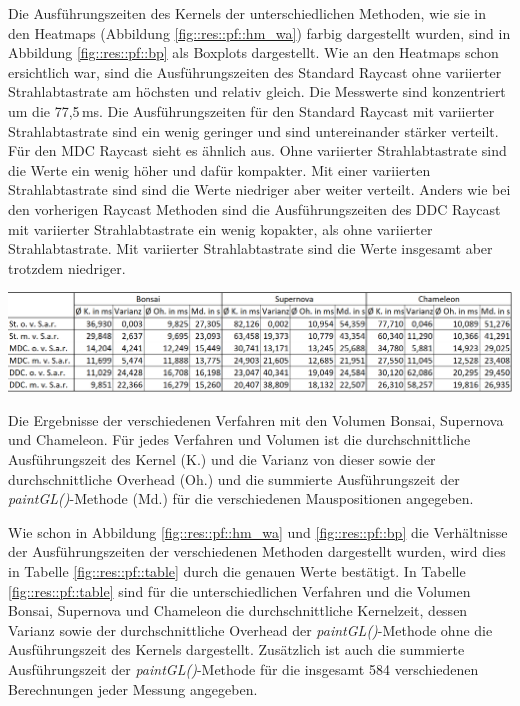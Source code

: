 Die Ausführungszeiten des Kernels der unterschiedlichen Methoden, wie sie in den Heatmaps (Abbildung \ref{fig::res::pf::hm_wa}) farbig dargestellt wurden, sind in Abbildung \ref{fig::res::pf::bp} als Boxplots dargestellt.
Wie an den Heatmaps schon ersichtlich war, sind die Ausführungszeiten des Standard Raycast ohne variierter Strahlabtastrate am höchsten und relativ gleich.
Die Messwerte sind konzentriert um die 77,5\,ms.
Die Ausführungszeiten für den Standard Raycast mit variierter Strahlabtastrate sind ein wenig geringer und sind untereinander stärker verteilt.
Für den MDC Raycast sieht es ähnlich aus.
Ohne variierter Strahlabtastrate sind die Werte ein wenig höher und dafür kompakter.
Mit einer variierten Strahlabtastrate sind sind die Werte niedriger aber weiter verteilt.
Anders wie bei den vorherigen Raycast Methoden sind die Ausführungszeiten des DDC Raycast mit variierter Strahlabtastrate ein wenig kopakter, als ohne variierter Strahlabtastrate.
Mit variierter Strahlabtastrate sind die Werte insgesamt aber trotzdem niedriger.

\begin{table}
	\centering
	\includegraphics[width=1\textwidth]{../../Neue_Messungen/Messungen_in_Tabelle.PNG}
	\caption{Die Ergebnisse der verschiedenen Verfahren mit den Volumen Bonsai, Supernova und Chameleon. Für jedes Verfahren und Volumen ist die durchschnittliche Ausführungszeit des Kernel (K.) und die Varianz von dieser sowie der durchschnittliche Overhead (Oh.) und die summierte Ausführungszeit der \emph{paintGL()}-Methode (Md.) für die verschiedenen Mauspositionen angegeben.}
	\label{fig::res::pf::table}
\end{table}

Wie schon in Abbildung \ref{fig::res::pf::hm_wa} und \ref{fig::res::pf::bp} die Verhältnisse der Ausführungszeiten der verschiedenen Methoden dargestellt wurden, wird dies in Tabelle \ref{fig::res::pf::table} durch die genauen Werte bestätigt.
In Tabelle \ref{fig::res::pf::table} sind für die unterschiedlichen Verfahren und die Volumen Bonsai, Supernova und Chameleon die durchschnittliche Kernelzeit, dessen Varianz sowie der durchschnittliche Overhead der \emph{paintGL()}-Methode ohne die Ausführungszeit des Kernels dargestellt.
Zusätzlich ist auch die summierte Ausführungszeit der \emph{paintGL()}-Methode für die insgesamt 584 verschiedenen Berechnungen jeder Messung angegeben.

